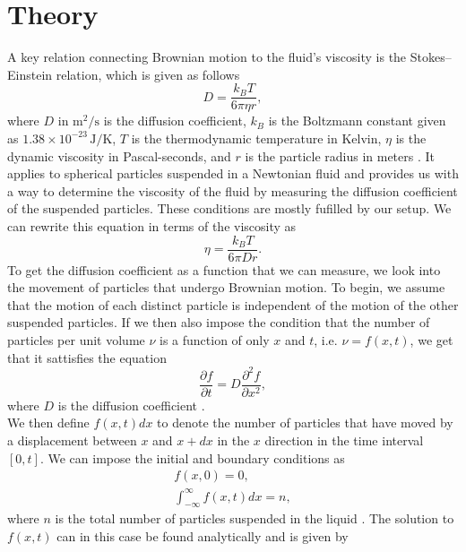 \documentclass[twocolumn,a4paper,aps,amsmath,amssymb,floatfix,superscriptaddress]{revtex4-2}
\begin{document}
    


\section{Theory}\label{theory}
    A key relation connecting Brownian motion to the fluid's viscosity is the Stokes–Einstein relation, which is given as follows
    \begin{equation}
        D = \frac{k_BT}{6\pi\eta r}, \label{SEr}
    \end{equation}
    where $D$ in $\text{m}^2/\text{s}$ is the diffusion coefficient, $k_B$ is the Boltzmann constant given as $1.38 \times 10^{-23} \, \text{J/K}$, $T$ is the thermodynamic temperature in Kelvin, $\eta$ is the dynamic viscosity in Pascal-seconds, and $r$ is the particle radius in meters \cite{einstein1905}. It applies to spherical particles suspended in a Newtonian fluid and provides us with a way to determine the viscosity of the fluid by measuring the diffusion coefficient of the suspended particles. These conditions are mostly fufilled by our setup. We can rewrite this equation in terms of the viscosity as
    \begin{equation}
        \eta = \frac{k_BT}{6\pi Dr}. \label{first_viscosity}
    \end{equation}
    To get the diffusion coefficient as a function that we can measure, we look into the movement of particles that undergo Brownian motion. To begin, we assume that the motion of each distinct particle is independent of the motion of the other suspended particles. If we then also impose the condition that the number of particles per unit volume $\nu$ is a function of only $x$ and $t$, i.e. $\nu = f(x, t)$, we get that it sattisfies the equation
    \begin{equation}
        \frac{\partial f}{\partial t} = D\frac{\partial^2 f}{\partial x^2},
    \end{equation}
    where $D$ is the diffusion coefficient \cite{einstein1905}.\\
    We then define $f(x, t)dx$ to denote the number of particles that have moved by a displacement between $x$ and $x + dx$ in the $x$ direction in the time interval $[0, t]$. We can impose the initial and boundary conditions as
    \begin{align*}
        f(x, 0) = 0,\\
        \int_{-\infty}^\infty f(x, t)dx = n,
    \end{align*}
    where $n$ is the total number of particles suspended in the liquid \cite{einstein1905}. The solution to $f(x, t)$ can in this case be found analytically and is given by
\end{document}
